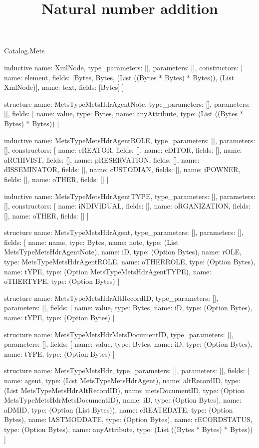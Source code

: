 \begin{lexlean}{Catalog.Mets}
\title{Natural number addition}
\begin{semanticmodule}
inductive{
  name: XmlNode,
  type_parameters: [],
  parameters: [],
  constructors: [
    {name: element, fields: [Bytes, Bytes, (List ((Bytes * Bytes) * Bytes)), (List XmlNode)]},
    {name: text, fields: [Bytes]}
  ]
}

structure{
  name: MetsTypeMetsHdrAgentNote,
  type_parameters: [],
  parameters: [],
  fields: [
    {name: value, type: Bytes},
    {name: anyAttribute, type: (List ((Bytes * Bytes) * Bytes))}
  ]
}

inductive{
  name: MetsTypeMetsHdrAgentROLE,
  type_parameters: [],
  parameters: [],
  constructors: [
    {name: cREATOR, fields: []},
    {name: eDITOR, fields: []},
    {name: aRCHIVIST, fields: []},
    {name: pRESERVATION, fields: []},
    {name: dISSEMINATOR, fields: []},
    {name: cUSTODIAN, fields: []},
    {name: iPOWNER, fields: []},
    {name: oTHER, fields: []}
  ]
}

inductive{
  name: MetsTypeMetsHdrAgentTYPE,
  type_parameters: [],
  parameters: [],
  constructors: [
    {name: iNDIVIDUAL, fields: []},
    {name: oRGANIZATION, fields: []},
    {name: oTHER, fields: []}
  ]
}

structure{
  name: MetsTypeMetsHdrAgent,
  type_parameters: [],
  parameters: [],
  fields: [
    {name: name, type: Bytes},
    {name: note, type: (List MetsTypeMetsHdrAgentNote)},
    {name: iD, type: (Option Bytes)},
    {name: rOLE, type: MetsTypeMetsHdrAgentROLE},
    {name: oTHERROLE, type: (Option Bytes)},
    {name: tYPE, type: (Option MetsTypeMetsHdrAgentTYPE)},
    {name: oTHERTYPE, type: (Option Bytes)}
  ]
}

structure{
  name: MetsTypeMetsHdrAltRecordID,
  type_parameters: [],
  parameters: [],
  fields: [
    {name: value, type: Bytes},
    {name: iD, type: (Option Bytes)},
    {name: tYPE, type: (Option Bytes)}
  ]
}

structure{
  name: MetsTypeMetsHdrMetsDocumentID,
  type_parameters: [],
  parameters: [],
  fields: [
    {name: value, type: Bytes},
    {name: iD, type: (Option Bytes)},
    {name: tYPE, type: (Option Bytes)}
  ]
}

structure{
  name: MetsTypeMetsHdr,
  type_parameters: [],
  parameters: [],
  fields: [
    {name: agent, type: (List MetsTypeMetsHdrAgent)},
    {name: altRecordID, type: (List MetsTypeMetsHdrAltRecordID)},
    {name: metsDocumentID, type: (Option MetsTypeMetsHdrMetsDocumentID)},
    {name: iD, type: (Option Bytes)},
    {name: aDMID, type: (Option (List Bytes))},
    {name: cREATEDATE, type: (Option Bytes)},
    {name: lASTMODDATE, type: (Option Bytes)},
    {name: rECORDSTATUS, type: (Option Bytes)},
    {name: anyAttribute, type: (List ((Bytes * Bytes) * Bytes))}
  ]
}


\end{semanticmodule}
\end{lexlean}

